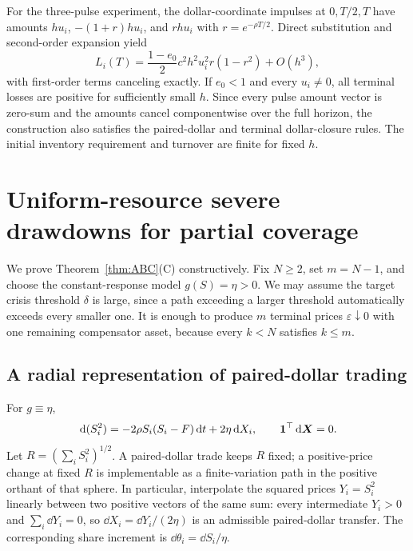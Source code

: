 \documentclass[review,hidelinks,onefignum,onetabnum]{siamonline250211}
\begin{document}
For the three-pulse experiment, the dollar-coordinate impulses at $0,T/2,T$ have amounts $hu_i$, $-(1+r)hu_i$, and $rhu_i$ with $r=e^{-\rho T/2}$. Direct substitution and second-order expansion yield
\begin{equation}\label{eq:local-three}
L_i(T)=\frac{1-e_0}{2}c^2h^2u_i^2r(1-r^2)+O(h^3),
\end{equation}
with first-order terms canceling exactly. If $e_0<1$ and every $u_i\ne0$, all terminal losses are positive for sufficiently small $h$. Since every pulse amount vector is zero-sum and the amounts cancel componentwise over the full horizon, the construction also satisfies the paired-dollar and terminal dollar-closure rules. The initial inventory requirement and turnover are finite for fixed $h$.

\section{Uniform-resource severe drawdowns for partial coverage}\label{app:severe}
We prove Theorem~\ref{thm:ABC}(C) constructively. Fix $N\ge2$, set $m=N-1$, and choose the constant-response model $g(S)=\eta>0$. We may assume the target crisis threshold $\delta$ is large, since a path exceeding a larger threshold automatically exceeds every smaller one. It is enough to produce $m$ terminal prices $\varepsilon\downarrow0$ with one remaining compensator asset, because every $k<N$ satisfies $k\le m$.

\subsection{A radial representation of paired-dollar trading}
For $g\equiv\eta$,
\begin{equation}\label{eq:radius-appendix}
\,\mathrm{d}(S_i^2)= -2\rho S_i(S_i-F)\,\mathrm{d} t+2\eta\,\mathrm{d} X_i,
\qquad \mathbf{1}^\top\,\mathrm{d}\bm X=0.
\end{equation}
Let $R=(\sum_iS_i^2)^{1/2}$. A paired-dollar trade keeps $R$ fixed; a positive-price change at fixed $R$ is implementable as a finite-variation path in the positive orthant of that sphere. In particular, interpolate the squared prices $Y_i=S_i^2$ linearly between two positive vectors of the same sum: every intermediate $Y_i>0$ and $\sum_i\dd Y_i=0$, so $\dd X_i=\dd Y_i/(2\eta)$ is an admissible paired-dollar transfer. The corresponding share increment is $\dd\theta_i=\dd S_i/\eta$.
\end{document}
